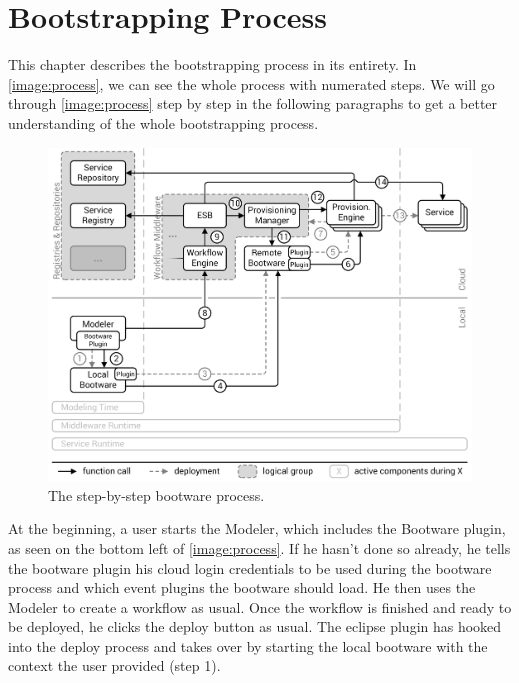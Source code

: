 \chapter{Bootstrapping Process}
\label{process}

This chapter describes the bootstrapping process in its entirety.
In \autoref{image:process}, we can see the whole process with numerated steps.
We will go through \autoref{image:process} step by step in the following paragraphs to get a better understanding of the whole bootstrapping process.

\begin{figure}[!htbp]
	\centering
	\includegraphics[resolution=600]{process/assets/process}
	\caption{The step-by-step bootware process.}
	\label{image:process}
\end{figure}

At the beginning, a user starts the Modeler, which includes the Bootware plugin, as seen on the bottom left of \autoref{image:process}.
If he hasn't done so already, he tells the bootware plugin his cloud login credentials to be used during the bootware process and which event plugins the bootware should load.
He then uses the Modeler to create a workflow as usual.
Once the workflow is finished and ready to be deployed, he clicks the deploy button as usual.
The eclipse plugin has hooked into the deploy process and takes over by starting the local bootware with the context the user provided (step 1).

